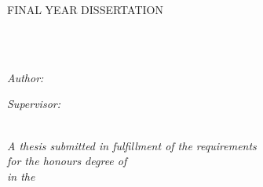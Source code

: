 \documentclass[
11pt, %
oneside,
english,
doublespacing, 
nolistspacing,
liststotoc, %
toctotoc, %
parskip, %
headsepline, %
consistentlayout, %
]{COVID-19 Detection - agl2} %
\author{Alister George Luiz} %
\begin{document}
\frontmatter %

\pagestyle{plain} %


\begin{titlepage}
\begin{center}

\vspace*{.06\textheight}
{\scshape\LARGE \univname\par}\vspace{1.5cm} %
\textsc{\Large FINAL YEAR DISSERTATION}\\[0.5cm] %

\HRule \\[0.4cm] %
{\huge \bfseries \ttitle\par}\vspace{0.4cm} %
\HRule \\[1.5cm] %
 
\begin{minipage}[t]{0.4\textwidth}
\begin{flushleft} \large
\emph{Author:}\\
\href{mailto:agl2@hw.ac.uk}{\authorname} %
\end{flushleft}
\end{minipage}
\begin{minipage}[t]{0.4\textwidth}
\begin{flushright} \large
\emph{Supervisor:} \\
\href{mailto:H.RagabHassen@hw.ac.uk}{\supname} %
\end{flushright}
\end{minipage}\\[1.5cm]
 

\large \textit{A thesis submitted in fulfillment of the requirements\\ for the honours degree of \degreename}\\[0.2cm] %
\textit{in the}\\[0.4cm]
\deptname\\[0.6cm] %
 

\end{center}
\end{titlepage}
\end{document}
